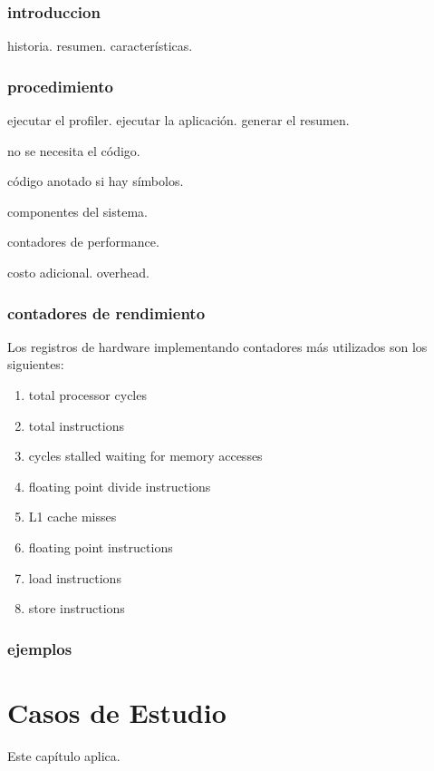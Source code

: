\documentclass[a4paper]{report}
\begin{document}
\subsection{introduccion}

historia. resumen. caracter\'isticas. 

\subsection{procedimiento}

ejecutar el profiler. ejecutar la aplicaci\'on. generar el resumen.

no se necesita el c\'odigo.

c\'odigo anotado si hay s\'imbolos.

componentes del sistema.

contadores de performance.

costo adicional. overhead.

\subsection{contadores de rendimiento}

Los registros de hardware implementando contadores m\'as utilizados son los siguientes:

\begin{enumerate}
\item total processor cycles
\item total instructions
\item cycles stalled waiting for memory accesses
\item floating point divide instructions
\item L1 cache misses
\item floating point instructions
\item load instructions
\item store instructions
\end{enumerate}

\subsection{ejemplos}

\chapter{Casos de Estudio}

Este cap\'itulo aplica.
\end{document}
